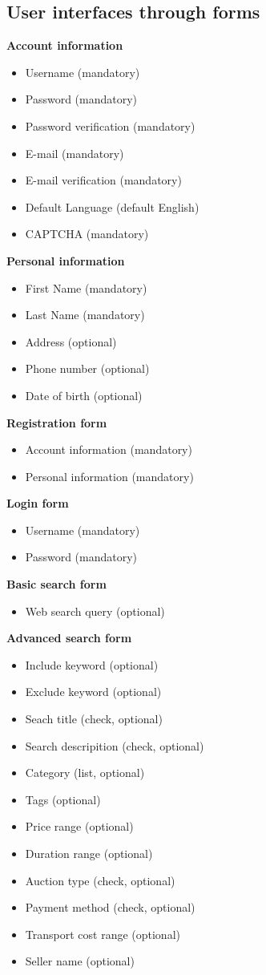 	\subsection{User interfaces through forms}
	\textbf{Account information}
		\begin{itemize}
			\item Username (mandatory)
			\item Password (mandatory)
			\item Password verification (mandatory)
			\item E-mail (mandatory)
			\item E-mail verification (mandatory)
			\item Default Language (default English)
			\item CAPTCHA (mandatory)
		\end{itemize}
	\textbf{Personal information}
		\begin{itemize}
			\item First Name (mandatory)
			\item Last Name (mandatory)
			\item Address (optional)
			\item Phone number (optional)
			\item Date of birth (optional)
		\end{itemize}
	\textbf{Registration form}
		\begin{itemize}
			\item Account information (mandatory)
			\item Personal information (mandatory)
		\end{itemize}
	\textbf{Login form}
		\begin{itemize}
			\item Username (mandatory)
			\item Password (mandatory)
		\end{itemize}
	\textbf{Basic search form}
		\begin{itemize}
			\item Web search query (optional)
		\end{itemize}
	\textbf{Advanced search form}
		\begin{itemize}
			\item Include keyword (optional)
			\item Exclude keyword (optional)
			\item Seach title (check, optional)
			\item Search descripition (check, optional)
			\item Category (list, optional)
			\item Tags (optional)
			\item Price range (optional)
			\item Duration range (optional)
			\item Auction type (check, optional)
			\item Payment method (check, optional)
			\item Transport cost range (optional)
			\item Seller name (optional)
		\end{itemize}
